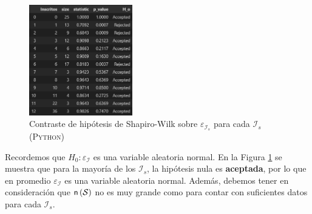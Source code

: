 \documentclass[11pt,a4paper]{book}
\theoremstyle{definition}%
\newcommand{\EV}[1]{\mathbb{E}\left[#1\right]}
\newcommand{\card}[1]{\text{\textsf{n}}\left( #1 \right)}
\begin{document}
                \begin{figure}[H]
                    \centering
                    \includegraphics[width=0.4\textwidth]{Sources/shapirowilk_InscritosParticipantesErrorPredict.png}
                    \caption{Contraste de hipótesis de Shapiro-Wilk sobre $\varepsilon_{\mathcal{I}_s}$ para cada $\mathcal{I}_s$ (\textsc{Python})}
                    \label{fig:shapirowilk_InscritosParticipantesErrorPredict}
                \end{figure}
                
                Recordemos que $H_0: \varepsilon_\mathcal{I}$ es una variable aleatoria normal. En la Figura \ref{fig:shapirowilk_InscritosParticipantesErrorPredict} se muestra que para la mayoría de los $\mathcal{I}_s$, la hipótesis nula es \textbf{aceptada}, por lo que en promedio $\varepsilon_\mathcal{I}$ es una variable aleatoria normal. Además, debemos tener en consideración que $\card{\mathcal{S}}$ no es muy grande como para contar con suficientes datos para cada $\mathcal{I}_s$.
                
\end{document}
